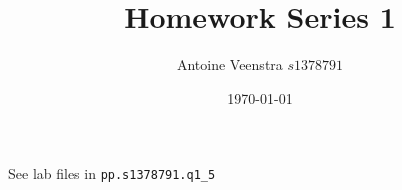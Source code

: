 \documentclass[a4paper]{article}
\author{Antoine Veenstra \(s1378791\)}
\title{Homework Series 1}
\date{\today}
\begin{document}
\maketitle

\section{}


\section{}


\section{}


\section{}


\section{}
See lab files in \texttt{pp.s1378791.q1\_5}
\end{document}
